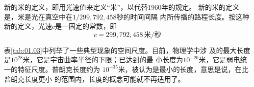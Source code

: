 \noindent 新的米的定义，即用光速值来定义“米”，以代替1960年的规定。
新的米的定义是，米是光在真空中在$ 1/299,792,458 $秒的时间间隔
内所传播的路程长度。按这种新的定义，光速$ c $是一固定的常数，即
\begin{equation*}
  c = 299,792,458 \, \text{米/秒}
\end{equation*}

表\ref{tab:01.03}中列举了一些典型现象的空间尺度。目前，物理学中涉
及的最大长度是$10^{28}$米，它是宇宙曲率半径的下限；已达到的最
小长度为$10^{-20}$米，它是弱电统一的特征尺度。普朗克长度约为
$10^{-35}$米，被认为是最小的长度，意思是说，在比普朗克长度更小
的范围内，长度的概念可能就不再适用了。
